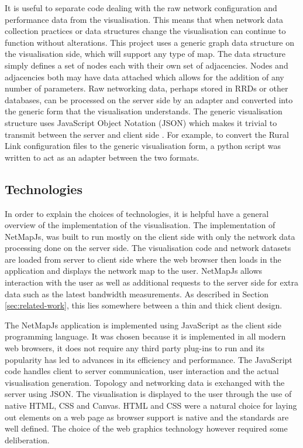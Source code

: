 \documentclass[11pt, a4paper]{article}
\begin{document}
It is useful to separate code dealing with the raw network configuration and
performance data from the visualisation. This means that when network data
collection practices or data structures change the visualisation can continue to
function without alterations. This project uses a generic graph data structure
on the visualisation side, which will support any type of map. The data
structure simply defines a set of nodes each with their own set of adjacencies.
Nodes and adjacencies both may have data attached which allows for the addition
of any number of parameters. Raw networking data, perhaps stored in RRDs or
other databases, can be processed on the server side by an adapter and converted
into the generic form that the visualisation understands. The generic
visualisation structure uses JavaScript Object Notation (JSON) which makes it
trivial to transmit between the server and client side \cite{rfc4627}. For
example, to convert the Rural Link configuration files to the generic visualisation
form, a python script was written to act as an adapter between the two formats. 


\subsection{Technologies}
\label{sec:technologies}

In order to explain the choices of technologies, it is helpful have a general
overview of the implementation of the visualisation. The implementation of
NetMapJs, was built to run mostly on the client side with only the network data
processing done on the server side. The visualisation code and network datasets
are loaded from server to client side where the web browser then loads in the
application and displays the network map to the user. NetMapJs allows
interaction with the user as well as additional requests to the server side for
extra data such as the latest bandwidth measurements. As described in Section
\ref{sec:related-work}, this lies somewhere between a thin and thick client
design.

The NetMapJs application is implemented using JavaScript as the client side
programming language. It was chosen because it is implemented in all modern web
browsers, it does not require any third party plug-ins to run and its popularity
has led to advances in its efficiency and performance. The JavaScript code
handles client to server communication, user interaction and the actual
visualisation generation. Topology and networking data is exchanged with the
server using JSON. The visualisation is displayed to the user through the use of
native HTML, CSS and Canvas. HTML and CSS were a natural choice for laying out
elements on a web page as browser support is native and the standards are well
defined. The choice of the web graphics technology however required some
deliberation. 
\end{document}
